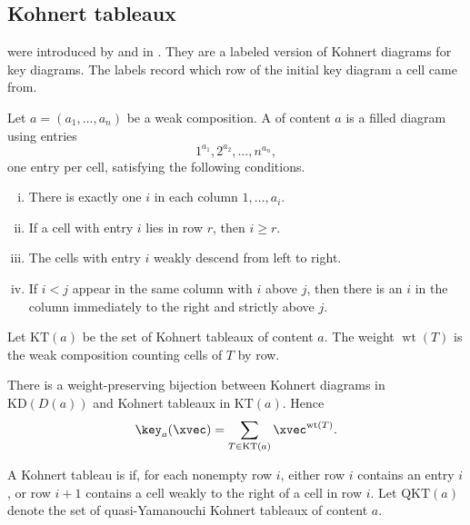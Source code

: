 \subsection[kohnertTableaux]{Kohnert tableaux}

 were introduced by
 and 
in \cite{AssafSearles2018}.  They are a labeled version of Kohnert diagrams
for key diagrams.  The labels record which row of the initial key diagram a
cell came from.

\begin{definition}
Let \(a=(a_1,\dotsc,a_n)\) be a weak composition.  A
\label{kohnertTableauDefinition} of content \(a\) is a
filled diagram using entries
\[
 1^{a_1},2^{a_2},\dotsc,n^{a_n},
\]
one entry per cell, satisfying the following conditions.
\begin{enumerate}[(i)]
\item There is exactly one \(i\) in each column \(1,\dotsc,a_i\).
\item If a cell with entry \(i\) lies in row \(r\), then \(i\geq r\).
\item The cells with entry \(i\) weakly descend from left to right.
\item If \(i<j\) appear in the same column with \(i\) above \(j\), then
there is an \(i\) in the column immediately to the right and strictly
above \(j\).
\end{enumerate}
Let \(\mathrm{KT}(a)\) be the set of Kohnert tableaux of content \(a\).
The weight \(\operatorname{wt}(T)\) is the weak composition counting cells
of \(T\) by row.
\end{definition}

\begin{theorem}
There is a weight-preserving bijection between Kohnert diagrams in
\(\mathrm{KD}(D(a))\) and Kohnert tableaux in \(\mathrm{KT}(a)\).  Hence
\[
 \key_a(\xvec) = \sum_{T \in \mathrm{KT}(a)} \xvec^{\operatorname{wt}(T)}.
\]
\end{theorem}


\begin{definition}
A Kohnert tableau is 
\label{quasiYamanouchiKohnertTableau} if, for each nonempty row \(i\), either
row \(i\) contains an entry \(i\), or row \(i+1\) contains a cell weakly to the
right of a cell in row \(i\).  Let \(\mathrm{QKT}(a)\) denote the set of
quasi-Yamanouchi Kohnert tableaux of content \(a\).
\end{definition}

